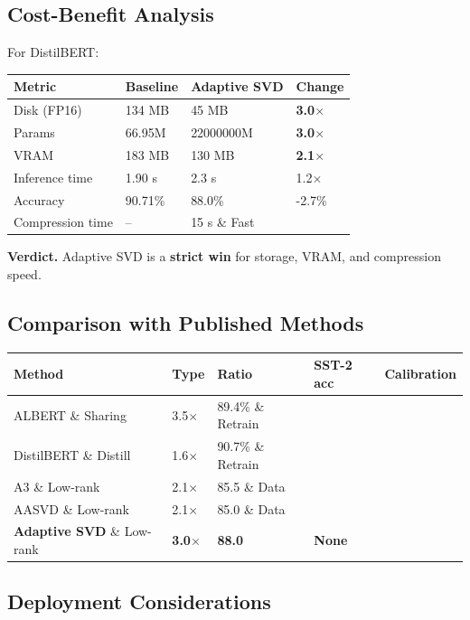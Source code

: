 \subsection{Cost-Benefit Analysis}

For DistilBERT:

\begin{table}[H]
\centering
\small
\begin{tabular}{llll}
\toprule
\textbf{Metric} & \textbf{Baseline} & \textbf{Adaptive SVD} & \textbf{Change} \\
\midrule
Disk (FP16) & 134 MB & 45 MB & \textbf{3.0$\times$} \\
Params & 66.95M & 22000000M & \textbf{3.0$\times$} \\
VRAM & 183 MB & 130 MB & \textbf{2.1$\times$} \\
Inference time & 1.90 s & 2.3 s & 1.2$\times$ \\
Accuracy & 90.71\% & 88.0\% & -2.7\% \\
Compression time & -- & 15 s \& Fast \\
\bottomrule
\end{tabular}
\end{table}

\textbf{Verdict.} Adaptive SVD is a \textbf{strict win} for storage, VRAM, and 
compression speed.

\subsection{Comparison with Published Methods}

\begin{table}[H]
\centering
\small
\begin{tabular}{lllll}
\toprule
\textbf{Method} & \textbf{Type} & \textbf{Ratio} & \textbf{SST-2 acc} & \textbf{Calibration} \\
\midrule
ALBERT \& Sharing & 3.5$\times$ & 89.4\% \& Retrain \\
DistilBERT \& Distill & 1.6$\times$ & 90.7\% \& Retrain \\
A3 \& Low-rank & 2.1$\times$ & 85.5 \& Data \\
AASVD \& Low-rank & 2.1$\times$ & 85.0 \& Data \\
\textbf{Adaptive SVD} \& Low-rank & \textbf{3.0$\times$} & \textbf{88.0} & \textbf{None} \\
\bottomrule
\end{tabular}
\end{table}

\subsection{Deployment Considerations}

